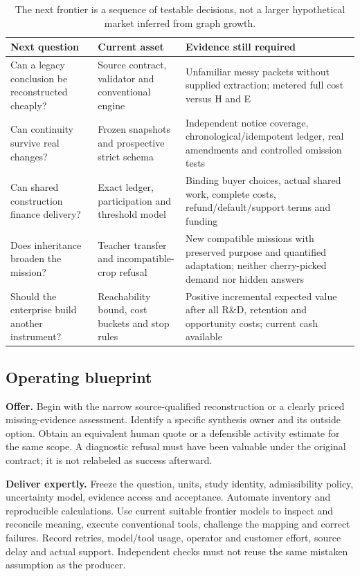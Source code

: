 \begin{table}[htbp]
\small
\begin{tabularx}{\textwidth}{YYY}
\toprule
Next question & Current asset & Evidence still required\\
\midrule
Can a legacy conclusion be reconstructed cheaply? & Source contract, validator and conventional engine & Unfamiliar messy packets without supplied extraction; metered full cost versus H and E\\
Can continuity survive real changes? & Frozen snapshots and prospective strict schema & Independent notice coverage, chronological/idempotent ledger, real amendments and controlled omission tests\\
Can shared construction finance delivery? & Exact ledger, participation and threshold model & Binding buyer choices, actual shared work, complete costs, refund/default/support terms and funding\\
Does inheritance broaden the mission? & Teacher transfer and incompatible-crop refusal & New compatible missions with preserved purpose and quantified adaptation; neither cherry-picked demand nor hidden answers\\
Should the enterprise build another instrument? & Reachability bound, cost buckets and stop rules & Positive incremental expected value after all R\&D, retention and opportunity costs; current cash available\\
\bottomrule
\end{tabularx}
\caption{The next frontier is a sequence of testable decisions, not a larger hypothetical market inferred from graph growth.}
\end{table}

\subsection{Operating blueprint}

\textbf{Offer.} Begin with the narrow source-qualified reconstruction or a clearly priced missing-evidence assessment. Identify a specific synthesis owner and its outside option. Obtain an equivalent human quote or a defensible activity estimate for the same scope. A diagnostic refusal must have been valuable under the original contract; it is not relabeled as success afterward.

\textbf{Deliver expertly.} Freeze the question, units, study identity, admissibility policy, uncertainty model, evidence access and acceptance. Automate inventory and reproducible calculations. Use current suitable frontier models to inspect and reconcile meaning, execute conventional tools, challenge the mapping and correct failures. Record retries, model/tool usage, operator and customer effort, source delay and actual support. Independent checks must not reuse the same mistaken assumption as the producer.


